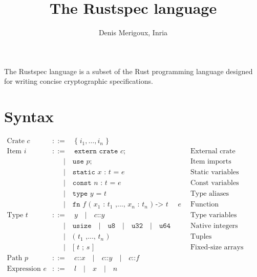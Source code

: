 \documentclass[10pt, english, a4paper]{article}
\title{The Rustspec language}
\author{Denis Merigoux, Inria}
\newcommand{\rust}[1]{\texttt{#1}}
\begin{document}
\maketitle

The Rustspec language is a subset of the Rust programming language designed
for writing concise cryptographic specifications.

\section{Syntax}

\begin{align*}
\text{Crate } \rust{$c$}  &::=\quad \{\;\rust{$i_1$},\ldots,\rust{$i_n$}\;\}\\
\text{Item } \rust{$i$}     &::=\quad \rust{extern crate $c$;}& \text{External crate imports} \\
                            &\quad\;\;|\quad \rust{use $p$;}& \text{Item imports} \\
                            &\quad\;\;|\quad \rust{static $x$ : $t$ = $e$}&\text{Static variables} \\
                            &\quad\;\;|\quad \rust{const $n$ : $t$ = $e$}&\text{Const variables (inlined)} \\
                            &\quad\;\;|\quad \rust{type $y$ = $t$}&\text{Type aliases} \\
                            &\quad\;\;|\quad \rust{fn $f$ ( $x_1$ : $t_1$ ,..., $x_n$ : $t_n$ ) -> $t$ { $e$ }}&\text{Function}\\
\text{Type }\rust{$t$}      &::=\quad \rust{$y$}
                            \quad|\quad \rust{$c$::$y$}&\text{Type variables} \\
                            &\quad\;\;|\quad \rust{usize}\quad |\quad \rust{u8}\quad |\quad \rust{u32}\quad |\quad \rust{u64}&\text{Native integers} \\
                            &\quad\;\;|\quad \rust{( $t_1$ ,..., $t_n$ )}&\text{Tuples} \\
                            &\quad\;\;|\quad \rust{[ $t$ ; $s$ ]}&\text{Fixed-size arrays} \\
\text{Path }\rust{$p$}      &::=\quad \rust{$c$::$x$}
                            \quad|\quad \rust{$c$::$y$}
                            \quad|\quad \rust{$c$::$f$} \\
\text{Expression }\rust{$e$}&::=\quad \rust{$l$}
                            \quad|\quad \rust{$x$}
                            \quad|\quad \rust{$n$}

\end{align*}
\end{document}
